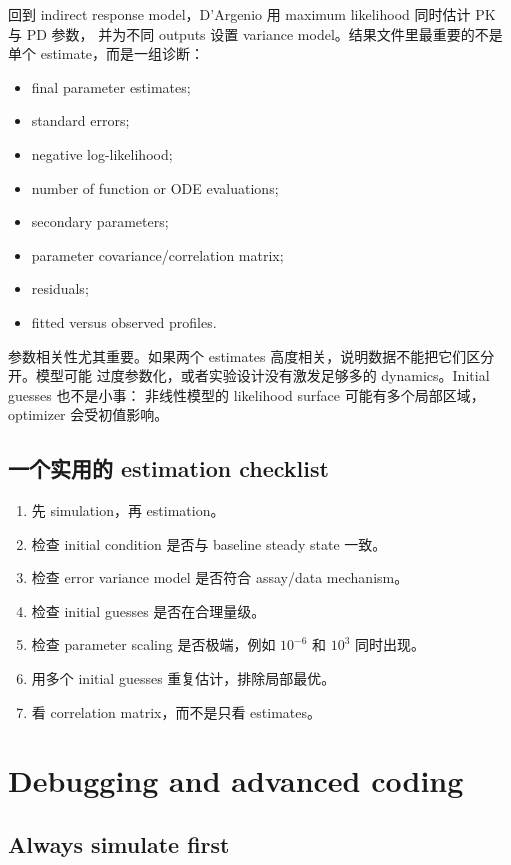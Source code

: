 \documentclass[a4paper]{article}
\begin{document}
回到 indirect response model，D'Argenio 用 maximum likelihood 同时估计 PK 与 PD 参数，
并为不同 outputs 设置 variance model。结果文件里最重要的不是单个 estimate，而是一组诊断：

\begin{itemize}
  \item final parameter estimates;
  \item standard errors;
  \item negative log-likelihood;
  \item number of function or ODE evaluations;
  \item secondary parameters;
  \item parameter covariance/correlation matrix;
  \item residuals;
  \item fitted versus observed profiles.
\end{itemize}

参数相关性尤其重要。如果两个 estimates 高度相关，说明数据不能把它们区分开。模型可能
过度参数化，或者实验设计没有激发足够多的 dynamics。Initial guesses 也不是小事：
非线性模型的 likelihood surface 可能有多个局部区域，optimizer 会受初值影响。

\subsection{一个实用的 estimation checklist}

\begin{enumerate}
  \item 先 simulation，再 estimation。
  \item 检查 initial condition 是否与 baseline steady state 一致。
  \item 检查 error variance model 是否符合 assay/data mechanism。
  \item 检查 initial guesses 是否在合理量级。
  \item 检查 parameter scaling 是否极端，例如 \(10^{-6}\) 和 \(10^3\) 同时出现。
  \item 用多个 initial guesses 重复估计，排除局部最优。
  \item 看 correlation matrix，而不是只看 estimates。
\end{enumerate}

\section{Debugging and advanced coding}

\subsection{Always simulate first}
\end{document}
